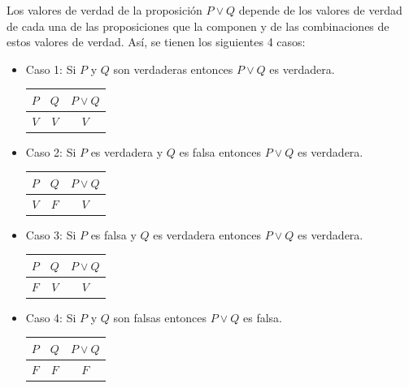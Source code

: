 \documentclass[letterpaper, twoside]{article}
\begin{document}
\newpage

Los valores de verdad de la proposición $P\lor Q$ depende de los valores de verdad de cada una de las proposiciones que la componen y de las combinaciones de estos valores de verdad. Así, se tienen los siguientes 4 casos:

\begin{itemize}
  \item Caso 1: Si $P$ y $Q$ son verdaderas entonces $P\lor Q$ es verdadera.
  \vspace{.5cm}
  \begin{center}
    \begin{tabular}{|c|c|c|}
    \hline
    $P$ & $Q$ & $P\lor Q$ \\ \hline
    $V$ & $V$ & $V$\\
    \hline
  \end{tabular}
  \end{center}
\vspace{.7cm}
  \item Caso 2: Si $P$ es verdadera y $Q$ es falsa entonces $P\lor Q$ es verdadera.
  \vspace{.5cm}
  \begin{center}
    \begin{tabular}{|c|c|c|}
    \hline
    $P$ & $Q$ & $P\lor Q$ \\ \hline
    $V$ & $F$ & $V$\\
    \hline
  \end{tabular}
  \end{center}
\vspace{.7cm}
  \item Caso 3: Si $P$ es falsa y $Q$ es verdadera entonces $P\lor Q$ es verdadera.
  \vspace{.5cm}
  \begin{center}
    \begin{tabular}{|c|c|c|}
    \hline
    $P$ & $Q$ & $P\lor Q$ \\ \hline
    $F$ & $V$ & $V$\\
    \hline
  \end{tabular}
  \end{center}
\vspace{.7cm}
  \item Caso 4: Si $P$ y $Q$ son falsas entonces $P\lor Q$ es falsa.
  \vspace{.5cm}
  \begin{center}
    \begin{tabular}{|c|c|c|}
    \hline
    $P$ & $Q$ & $P\lor Q$ \\ \hline
    $F$ & $F$ & $F$\\
    \hline
  \end{tabular}
  \end{center}

\end{itemize}
\end{document}
